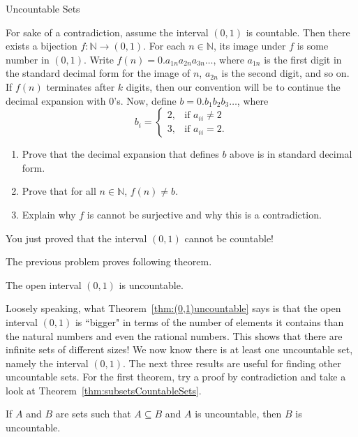 \begin{section}{Uncountable Sets}
\begin{problem}
For sake of a contradiction, assume the interval $(0,1)$ is countable.  Then there exists a bijection $f:\mathbb{N}\to (0,1)$. For each $n\in\mathbb{N}$, its image under $f$ is some number in $(0,1)$.  Write $f(n)=0.a_{1n}a_{2n}a_{3n}\ldots$, where $a_{1n}$ is the first digit in the standard decimal form for the image of $n$, $a_{2n}$ is the second digit, and so on. If $f(n)$ terminates after $k$ digits, then our convention will be to continue the decimal expansion with 0's. Now, define $b=0.b_1b_2b_3\ldots$, where
\[
b_i=\begin{cases}
2, & \text{if }a_{ii}\neq 2\\
3, & \text{if }a_{ii}=2.
\end{cases}
\]
\begin{enumerate}[label=\textrm{(\alph*)}]
\item Prove that the decimal expansion that defines $b$ above is in standard decimal form.
\item Prove that for all $n\in\mathbb{N}$, $f(n)\neq b$.
\item Explain why $f$ is cannot be surjective and why this is a contradiction.
\end{enumerate}
You just proved that the interval $(0,1)$ cannot be countable!
\end{problem}

The previous problem proves following theorem.

\begin{theorem}\label{thm:(0,1)uncountable}
The open interval $(0,1)$ is uncountable.
\end{theorem}

Loosely speaking, what Theorem~\ref{thm:(0,1)uncountable} says is that the open interval $(0,1)$ is ``bigger" in terms of the number of elements it contains than the natural numbers and even the rational numbers.  This shows that there are infinite sets of different sizes! We now know there is at least one uncountable set, namely the interval $(0,1)$.  The next three results are useful for finding other uncountable sets. For the first theorem, try a proof by contradiction and take a look at Theorem~\ref{thm:subsetsCountableSets}.

\begin{theorem}\label{thm:containsUncountableSubset}
If $A$ and $B$ are sets such that $A\subseteq B$ and $A$ is uncountable, then $B$ is uncountable. 
\end{theorem}


\end{section}
